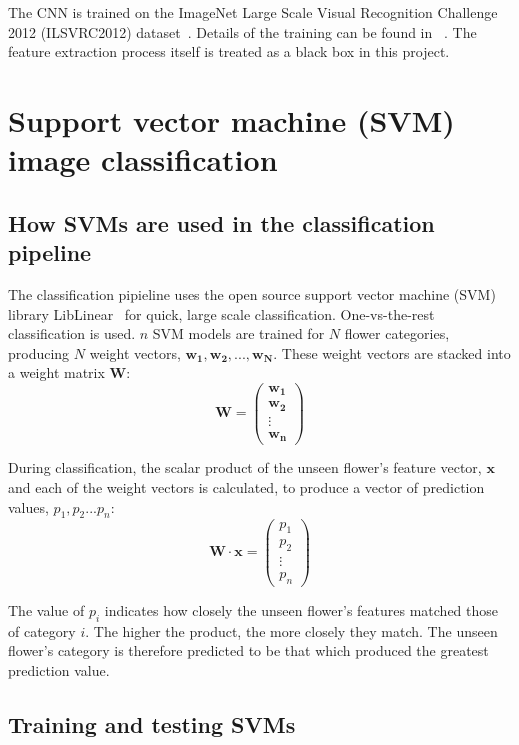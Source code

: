 \documentclass[11pt, a4paper]{report}
\newcommand{\vect}[1]{\boldsymbol{#1}}
\begin{document}
The CNN is trained on the ImageNet Large Scale Visual Recognition Challenge 2012 (ILSVRC2012) dataset~\cite{CNN:Imagenet}. Details of the training can be found in ~\cite{Chatfield14}. The feature extraction process itself is treated as a black box in this project. 

 


\section{Support vector machine (SVM) image classification}

\subsection{How SVMs are used in the classification pipeline}

The classification pipieline uses the open source support vector machine (SVM) library LibLinear~\cite{SVM:LibLinear} for quick, large scale classification. One-vs-the-rest classification is used. $n$ SVM models are trained for $N$ flower categories, producing $N$ weight vectors, $\vect{w_{1}}, \vect{w_{2}}, ..., \vect{w_{N}}$. These weight vectors are stacked into a weight matrix $\vect{W}$: 
$$
\vect{W} = 
\begin{pmatrix}
\vect{w_{1}}\\  
\vect{w_{2}}\\ 
\vdots \\ 
\vect{w_{n}}
\end{pmatrix}
$$



During classification, the scalar product of the unseen flower's feature vector, $\vect{x}$ and each of the weight vectors is calculated, to produce a vector of prediction values, $p_{1}, p_{2} ... p_{n}$:
$$
\vect{W} \cdot \vect{x} =
\begin{pmatrix}
p_{1}\\  
p_{2}\\ 
\vdots \\ 
p_{n}
\end{pmatrix}
$$

The value of $p_{i}$ indicates how closely the unseen flower's features matched those of category $i$. The higher the product, the more closely they match. The unseen flower's category is therefore predicted to be that which produced the greatest prediction value. 



\subsection{Training and testing SVMs}
\end{document}
